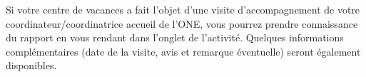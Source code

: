 Si votre centre de vacances a fait l'objet d'une visite d'accompagnement de votre coordinateur/coordinatrice accueil de l'ONE, vous pourrez prendre connaissance du rapport en vous rendant dans l'onglet  de l'activité. Quelques informations complémentaires (date de la visite, avis et remarque éventuelle) seront également disponibles. 